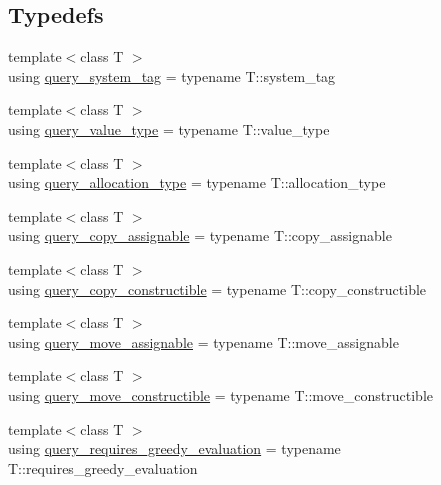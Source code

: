 \subsection*{Typedefs}
\begin{DoxyCompactItemize}
\item 
{\footnotesize template$<$class T $>$ }\\using \hyperlink{namespacebc_1_1tensors_1_1exprs_1_1detail_aa067b2ce78c8e7218f47bded8aec80a8}{query\+\_\+system\+\_\+tag} = typename T\+::system\+\_\+tag
\item 
{\footnotesize template$<$class T $>$ }\\using \hyperlink{namespacebc_1_1tensors_1_1exprs_1_1detail_aa60e0a71bcf8048661b38b904c620fb0}{query\+\_\+value\+\_\+type} = typename T\+::value\+\_\+type
\item 
{\footnotesize template$<$class T $>$ }\\using \hyperlink{namespacebc_1_1tensors_1_1exprs_1_1detail_aa48f3a00816d9b230e5f0ce720323f57}{query\+\_\+allocation\+\_\+type} = typename T\+::allocation\+\_\+type
\item 
{\footnotesize template$<$class T $>$ }\\using \hyperlink{namespacebc_1_1tensors_1_1exprs_1_1detail_a48ce13185316802e0ca8ad8cee7d5870}{query\+\_\+copy\+\_\+assignable} = typename T\+::copy\+\_\+assignable
\item 
{\footnotesize template$<$class T $>$ }\\using \hyperlink{namespacebc_1_1tensors_1_1exprs_1_1detail_abac935bf36b4924c73532023e11f75c2}{query\+\_\+copy\+\_\+constructible} = typename T\+::copy\+\_\+constructible
\item 
{\footnotesize template$<$class T $>$ }\\using \hyperlink{namespacebc_1_1tensors_1_1exprs_1_1detail_ac325e0e2cef5518953db86853d9780fc}{query\+\_\+move\+\_\+assignable} = typename T\+::move\+\_\+assignable
\item 
{\footnotesize template$<$class T $>$ }\\using \hyperlink{namespacebc_1_1tensors_1_1exprs_1_1detail_a19fd04baa3f6d8fcce66c01e51b7399d}{query\+\_\+move\+\_\+constructible} = typename T\+::move\+\_\+constructible
\item 
{\footnotesize template$<$class T $>$ }\\using \hyperlink{namespacebc_1_1tensors_1_1exprs_1_1detail_a0e9b0b3486b5ec529b2c622f14b688f9}{query\+\_\+requires\+\_\+greedy\+\_\+evaluation} = typename T\+::requires\+\_\+greedy\+\_\+evaluation

\end{DoxyCompactItemize}
